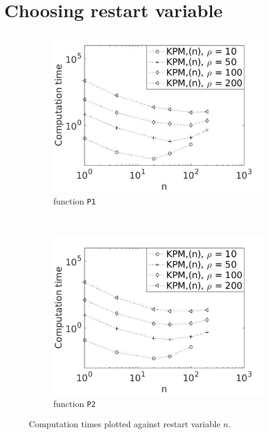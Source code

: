 \section{Choosing restart variable } \label{sec:restvar}
\begin{figure}[H]
        \centering
        \begin{subfigure}[b]{0.45\textwidth}
                \includegraphics[width=\textwidth]{fig/s9rest1}
                \caption{function \texttt{P1}}
                \label{fig:rest1}
        \end{subfigure}
~
        \begin{subfigure}[b]{0.45\textwidth}
                \includegraphics[width=\textwidth]{fig/s10rest2}
                \caption{function \texttt{P2}}
                \label{fig:rest2}
        \end{subfigure}
        \caption{Computation times plotted against restart variable $n$.}\label{fig:rest}
\end{figure}
